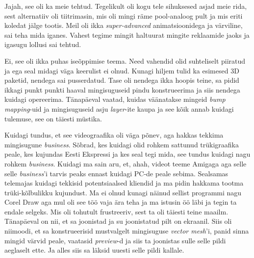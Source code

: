 Jajah, see oli ka meie tehtud. Tegelikult oli kogu tele sihuksesed asjad meie 
rida, sest  alternatiiv oli tiitrimasin, mis oli mingi räme pool-analoog pult 
ja mis  eriti koledat jälge tootis. Meil oli ikka \emph{super-advanced} 
animatsioonidega ja värviline, sai teha mida iganes. Vahest tegime mingit 
haltuurat mingite reklaamide jaoks ja igasugu lollusi sai tehtud.


Ei, see oli ikka puhas iseõppimise teema. Need vahendid olid suhteliselt 
piiratud ja ega seal midagi väga keerulist ei olnud. Kunagi hiljem tulid ka 
esimesed 3D paketid, nendega sai pusserdatud. Tase oli nendega ikka hoopis 
teine, sa pidid ikkagi punkt punkti haaval mingisuguseid pindu konstrueerima ja 
siis nendega kuidagi opereerima. Tänapäeval vaatad, kuidas väänatakse mingeid 
\emph{bump mapping}-uid ja 
mingisuguseid asju \emph{layer}-ite kaupa ja see kõik annab kuidagi tulemuse,  
see on täiesti müstika. 


Kuidagi tundus, et see videograafika oli  väga põnev, aga hakkas tekkima 
mingisugune \emph{business}. Sõbrad, kes kuidagi olid rohkem sattunud 
trükigraafika peale, kes  kujundas Eesti Ekspressi ja kes seal tegi mida, see 
tundus kuidagi nagu rohkem \emph{business}. Kuidagi ma sain aru, et, ahah, 
videot teeme Amigaga aga selle selle \emph{business}'i tarvis peaks ennast 
kuidagi PC-de peale  sebima. Sealsamas telemajas kuidagi tekkisid 
potentsiaalsed kliendid ja ma pidin hakkama tootma trüki-kõlbulikku kujundust. 
Ma ei olnud  kunagi näinud sellist programmi nagu Corel Draw 
aga mul oli see töö vaja  ära teha ja ma istusin öö läbi ja tegin ta endale 
selgeks. Mis oli tohutult frustreeriv, sest ta oli täiesti teine maailm. 
Tänapäeval on nii, et sa joonistad ja su joonistatud pilt on  ekraanil. Siis 
oli niimoodi, et sa  konstrueerisid mustvalgelt mingisuguse \emph{vector 
mesh}'i, panid sinna mingid värvid peale, vaatasid \emph{preview}-d ja siis ta 
joonistas sulle selle pildi aeglaselt ette. Ja alles siis sa läksid uuesti 
selle pildi kallale.


